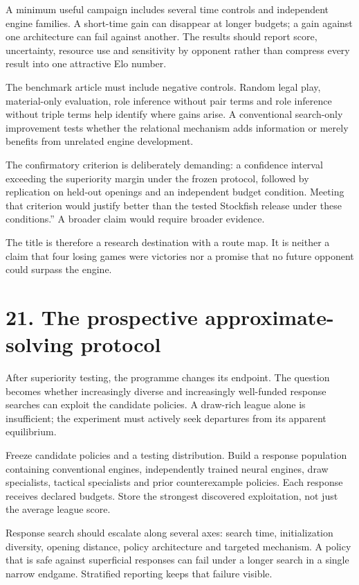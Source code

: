 \documentclass[10pt]{article}
\begin{document}
A minimum useful campaign includes several time controls and independent engine families. A short-time gain can disappear at longer budgets; a gain against one architecture can fail against another. The results should report score, uncertainty, resource use and sensitivity by opponent rather than compress every result into one attractive Elo number.

The benchmark article must include negative controls. Random legal play, material-only evaluation, role inference without pair terms and role inference without triple terms help identify where gains arise. A conventional search-only improvement tests whether the relational mechanism adds information or merely benefits from unrelated engine development.

The confirmatory criterion is deliberately demanding: a confidence interval exceeding the superiority margin under the frozen protocol, followed by replication on held-out openings and an independent budget condition. Meeting that criterion would justify better than the tested Stockfish release under these conditions.'' A broader claim would require broader evidence.

The title is therefore a research destination with a route map. It is neither a claim that four losing games were victories nor a promise that no future opponent could surpass the engine.

\clearpage
\section*{21. The prospective approximate-solving protocol}
After superiority testing, the programme changes its endpoint. The question becomes whether increasingly diverse and increasingly well-funded response searches can exploit the candidate policies. A draw-rich league alone is insufficient; the experiment must actively seek departures from its apparent equilibrium.

Freeze candidate policies and a testing distribution. Build a response population containing conventional engines, independently trained neural engines, draw specialists, tactical specialists and prior counterexample policies. Each response receives declared budgets. Store the strongest discovered exploitation, not just the average league score.

Response search should escalate along several axes: search time, initialization diversity, opening distance, policy architecture and targeted mechanism. A policy that is safe against superficial responses can fail under a longer search in a single narrow endgame. Stratified reporting keeps that failure visible.
\end{document}
